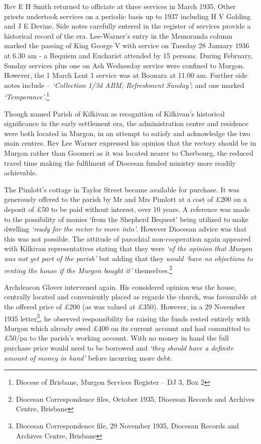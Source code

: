Rev E H Smith returned to officiate at three services in March 1935. Other priests undertook services on a periodic basis up to 1937 including H V Golding and J E Devine. Side notes carefully entered in the register of services provide a historical record of the era. Lee-Warner's entry in the Memoranda column marked the passing of King George V with service on Tuesday 28 January 1936 at 6.30 am - a Requiem and Eucharist attended by 15 persons. During February, Sunday services plus one on Ash Wednesday service were confined to Murgon. However, the 1 March Lent 1 service was at Boonara at 11.00 am. Further side notes include -- \emph{`Collection 1/3d ABM; Refreshment Sunday'}; and one marked \emph{`Temperance'}.\footnote{Diocese of Brisbane, Murgon Services Register -- DJ 3, Box 2}

Though named Parish of Kilkivan as recognition of Kilkivan's historical significance in the early settlement era, the administration centre and residence were both located in Murgon, in an attempt to satisfy and acknowledge the two main centres. Rev Lee Warner expressed his opinion that the rectory should be in Murgon rather than Goomeri as it was located nearer to Cherbourg, the reduced travel time making the fulfilment of Diocesan funded ministry more readily achievable.

The Pimlott's cottage in Taylor Street became available for purchase. It was generously offered to the parish by Mr and Mrs Pimlott at a cost of £200 on a deposit of £50 to be paid without interest, over 10 years. A reference was made to the possibility of monies `from the Shepherd Bequest' being utilized to make dwelling \emph{`ready for the rector to move into'}. However Diocesan advice was that this was not possible. The attitude of parochial non-cooperation again appeared with Kilkivan representatives stating that they were \emph{`of the opinion that Murgon was not yet part of the parish'} but adding that they \emph{would `have no objections to renting the house if the Murgon bought it'} themselves.\footnote{Diocesan Correspondence files, October 1935, Diocesan Records and Archives Centre, Brisbane}

Archdeacon Glover intervened again. His considered opinion was the house, centrally located and conveniently placed as regards the church, was favourable at the offered price of £200 (as was valued at £350). However, in a 29 November 1935 letter\footnote{Diocesan Correspondence file, 29 November 1935, Diocesan Records and Archives Centre, Brisbane}, he observed responsibility for raising the funds rested entirely with Murgon which already owed £400 on its current account and had committed to £50/pa to the parish's working account. With no money in hand the full purchase price would need to be borrowed and \emph{`they should have a definite amount of money in hand'} before incurring more debt.

